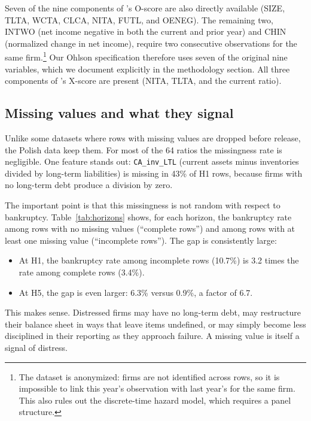 \documentclass[12pt,a4paper]{article}
\begin{document}
Seven of the nine components of \cite{ohlson1980}'s O-score are also
directly available (SIZE, TLTA, WCTA, CLCA, NITA, FUTL, and OENEG). The
remaining two, INTWO (net income negative in both the current and prior
year) and CHIN (normalized change in net income), require two consecutive
observations for the same firm.\footnote{The dataset is anonymized: firms
are not identified across rows, so it is impossible to link this year's
observation with last year's for the same firm. This also rules out the
\cite{shumway2001} discrete-time hazard model, which requires a panel
structure.} Our Ohlson specification therefore uses seven of the original
nine variables, which we document explicitly in the methodology section.
All three components of \cite{zmijewski1984}'s X-score are present
(NITA, TLTA, and the current ratio).

\subsection{Missing values and what they signal}
\label{sec:missing}

Unlike some datasets where rows with missing values are dropped before
release, the Polish data keep them. For most of the 64 ratios the missingness
rate is negligible. One feature stands out: \texttt{CA\_inv\_LTL} (current
assets minus inventories divided by long-term liabilities) is missing in 43\%
of H1 rows, because firms with no long-term debt produce a division by zero.

The important point is that this missingness is not random with respect to
bankruptcy. Table~\ref{tab:horizons} shows, for each horizon, the bankruptcy
rate among rows with no missing values (``complete rows'') and among rows
with at least one missing value (``incomplete rows''). The gap is
consistently large:

\begin{itemize}
\item At H1, the bankruptcy rate among incomplete rows (10.7\%) is
      3.2 times the rate among complete rows (3.4\%).
\item At H5, the gap is even larger: 6.3\% versus 0.9\%, a factor of 6.7.
\end{itemize}

This makes sense. Distressed firms may have no long-term debt, may
restructure their balance sheet in ways that leave items undefined, or may
simply become less disciplined in their reporting as they approach failure.
A missing value is itself a signal of distress.
\end{document}
